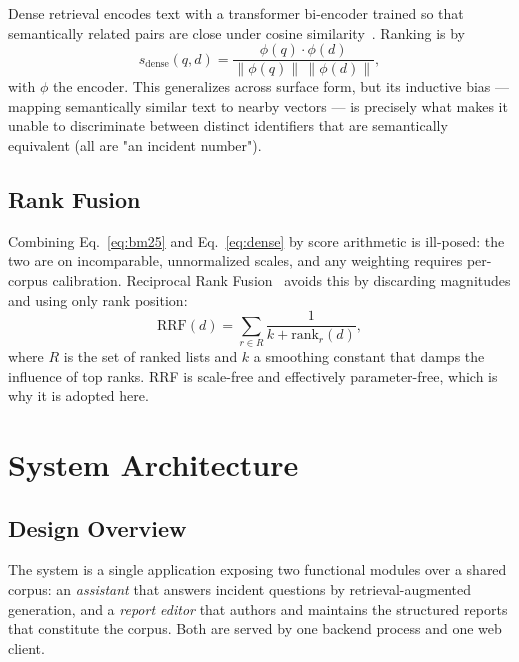 \documentclass[12pt, a4paper]{article}
\begin{document}
Dense retrieval encodes text with a transformer bi-encoder trained so that semantically related pairs are close under cosine similarity~\cite{reimers2019sbert}. Ranking is by
\begin{equation}
s_{\text{dense}}(q,d) = \frac{\phi(q) \cdot \phi(d)}{\lVert \phi(q) \rVert \, \lVert \phi(d) \rVert},
\label{eq:dense}
\end{equation}
with $\phi$ the encoder. This generalizes across surface form, but its inductive bias — mapping semantically similar text to nearby vectors — is precisely what makes it unable to discriminate between distinct identifiers that are semantically equivalent (all are "an incident number").

\subsection{Rank Fusion}

Combining Eq.~\eqref{eq:bm25} and Eq.~\eqref{eq:dense} by score arithmetic is ill-posed: the two are on incomparable, unnormalized scales, and any weighting requires per-corpus calibration. Reciprocal Rank Fusion~\cite{cormack2009rrf} avoids this by discarding magnitudes and using only rank position:
\begin{equation}
\text{RRF}(d) = \sum_{r \in R} \frac{1}{k + \text{rank}_r(d)},
\label{eq:rrf}
\end{equation}
where $R$ is the set of ranked lists and $k$ a smoothing constant that damps the influence of top ranks. RRF is scale-free and effectively parameter-free, which is why it is adopted here.

\section{System Architecture}
\label{sec:arch}

\subsection{Design Overview}

The system is a single application exposing two functional modules over a shared corpus: an \emph{assistant} that answers incident questions by retrieval-augmented generation, and a \emph{report editor} that authors and maintains the structured reports that constitute the corpus. Both are served by one backend process and one web client.
\end{document}

